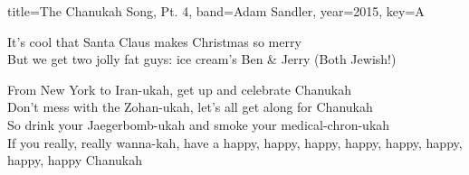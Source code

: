 \documentclass{skrul-leadsheet}
\begin{document}
\begin{song}[transpose-capo=true]{title={The Chanukah Song, Pt. 4}, band={Adam Sandler}, year={2015}, key={A}}
\begin{prechorus}
It's cool that Santa Claus makes Christmas so merry \\
But we get two jolly fat guys: ice cream's Ben \& Jerry (Both Jewish!)
\end{prechorus} 

\begin{outro}
From New York to Iran-ukah, get up and celebrate Chanukah \\
Don't mess with the Zohan-ukah, let's all get along for Chanukah \\
So drink your Jaegerbomb-ukah and smoke your medical-chron-ukah \\
If you really, really wanna-kah, have a happy, happy, happy, happy, happy, happy, happy, happy Chanukah
\end{outro}

\end{song}
\end{document}
